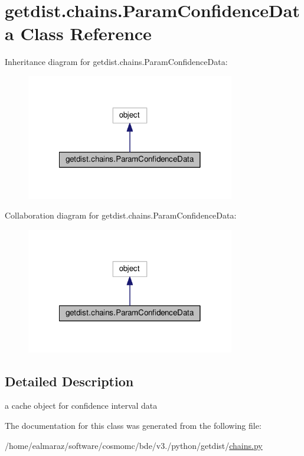 \hypertarget{classgetdist_1_1chains_1_1ParamConfidenceData}{}\section{getdist.\+chains.\+Param\+Confidence\+Data Class Reference}
\label{classgetdist_1_1chains_1_1ParamConfidenceData}


Inheritance diagram for getdist.\+chains.\+Param\+Confidence\+Data\+:
\nopagebreak
\begin{figure}[H]
\begin{center}
\leavevmode
\includegraphics[width=258pt]{classgetdist_1_1chains_1_1ParamConfidenceData__inherit__graph}
\end{center}
\end{figure}


Collaboration diagram for getdist.\+chains.\+Param\+Confidence\+Data\+:
\nopagebreak
\begin{figure}[H]
\begin{center}
\leavevmode
\includegraphics[width=258pt]{classgetdist_1_1chains_1_1ParamConfidenceData__coll__graph}
\end{center}
\end{figure}


\subsection{Detailed Description}
\begin{DoxyVerb}a cache object for confidence interval data
\end{DoxyVerb}
 

The documentation for this class was generated from the following file\+:\begin{DoxyCompactItemize}
\item 
/home/ealmaraz/software/cosmomc/bde/v3./python/getdist/\mbox{\hyperlink{chains_8py}{chains.\+py}}\end{DoxyCompactItemize}
